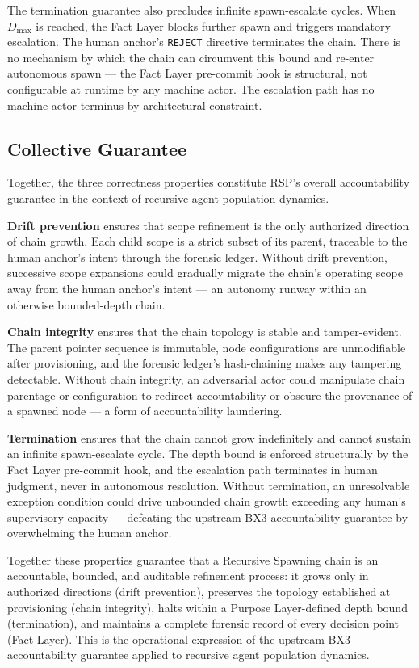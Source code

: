 The termination guarantee also precludes infinite spawn-escalate cycles. When $D_{\mathrm{max}}$ is reached, the Fact Layer blocks further spawn and triggers mandatory escalation. The human anchor's \texttt{REJECT} directive terminates the chain. There is no mechanism by which the chain can circumvent this bound and re-enter autonomous spawn — the Fact Layer pre-commit hook is structural, not configurable at runtime by any machine actor. The escalation path has no machine-actor terminus by architectural constraint.

\subsection{Collective Guarantee}
\label{sec:rs-collective-guarantee}

Together, the three correctness properties constitute RSP's overall accountability guarantee in the context of recursive agent population dynamics.

\medskip
\textbf{Drift prevention} ensures that scope refinement is the only authorized direction of chain growth. Each child scope is a strict subset of its parent, traceable to the human anchor's intent through the forensic ledger. Without drift prevention, successive scope expansions could gradually migrate the chain's operating scope away from the human anchor's intent — an autonomy runway within an otherwise bounded-depth chain.

\medskip
\textbf{Chain integrity} ensures that the chain topology is stable and tamper-evident. The parent pointer sequence is immutable, node configurations are unmodifiable after provisioning, and the forensic ledger's hash-chaining makes any tampering detectable. Without chain integrity, an adversarial actor could manipulate chain parentage or configuration to redirect accountability or obscure the provenance of a spawned node — a form of accountability laundering.

\medskip
\textbf{Termination} ensures that the chain cannot grow indefinitely and cannot sustain an infinite spawn-escalate cycle. The depth bound is enforced structurally by the Fact Layer pre-commit hook, and the escalation path terminates in human judgment, never in autonomous resolution. Without termination, an unresolvable exception condition could drive unbounded chain growth exceeding any human's supervisory capacity — defeating the upstream BX3 accountability guarantee by overwhelming the human anchor.

Together these properties guarantee that a Recursive Spawning chain is an accountable, bounded, and auditable refinement process: it grows only in authorized directions (drift prevention), preserves the topology established at provisioning (chain integrity), halts within a Purpose Layer-defined depth bound (termination), and maintains a complete forensic record of every decision point (Fact Layer). This is the operational expression of the upstream BX3 accountability guarantee applied to recursive agent population dynamics.
